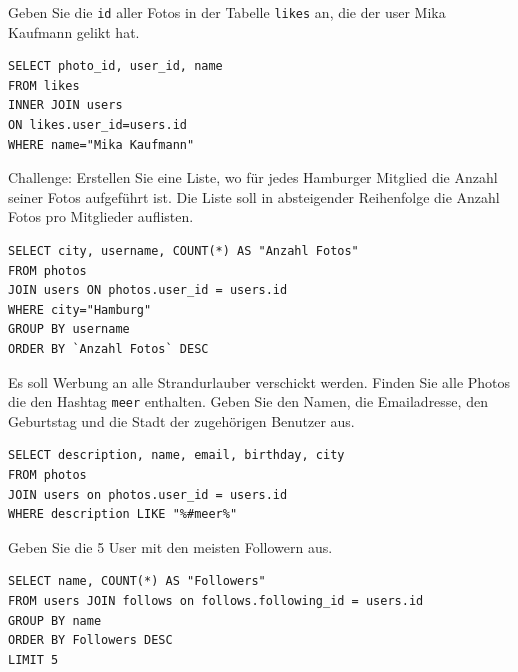 \begin{myexercise}
  Geben Sie die \texttt{id} aller Fotos in der Tabelle \texttt{likes} an, die der user Mika Kaufmann gelikt hat.
  \begin{myanswer}
    \begin{lstlisting}[style=sql]
SELECT photo_id, user_id, name 
FROM likes 
INNER JOIN users 
ON likes.user_id=users.id 
WHERE name="Mika Kaufmann"
\end{lstlisting}
  \end{myanswer}
\end{myexercise}
\begin{mychallenge}
  Challenge: Erstellen Sie eine Liste, wo für jedes Hamburger Mitglied die Anzahl seiner Fotos aufgeführt ist. Die Liste soll in absteigender Reihenfolge die Anzahl Fotos pro Mitglieder auflisten.
  \begin{myanswer}
    \begin{lstlisting}[style=sql]
SELECT city, username, COUNT(*) AS "Anzahl Fotos" 
FROM photos 
JOIN users ON photos.user_id = users.id 
WHERE city="Hamburg" 
GROUP BY username 
ORDER BY `Anzahl Fotos` DESC
\end{lstlisting}
  \end{myanswer}
\end{mychallenge}

\begin{myexercise}
  Es soll Werbung an alle Strandurlauber verschickt werden. Finden Sie alle Photos die den Hashtag \texttt{meer} enthalten. Geben Sie den Namen, die Emailadresse, den Geburtstag und die Stadt der zugehörigen Benutzer aus.
  \begin{myanswer}
    \begin{lstlisting}[style=sql]
SELECT description, name, email, birthday, city  
FROM photos 
JOIN users on photos.user_id = users.id 
WHERE description LIKE "%#meer%"
\end{lstlisting}
  \end{myanswer}
\end{myexercise}

\begin{mysubmission}
  Geben Sie die 5 User mit den meisten Followern aus.
  \begin{myanswer}
    \begin{lstlisting}[style=sql]
SELECT name, COUNT(*) AS "Followers"
FROM users JOIN follows on follows.following_id = users.id 
GROUP BY name
ORDER BY Followers DESC
LIMIT 5
\end{lstlisting}
  \end{myanswer}
\end{mysubmission}

